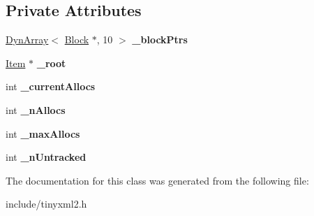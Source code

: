 \subsection*{Private Attributes}
\begin{DoxyCompactItemize}
\item 
\mbox{\label{classtinyxml2_1_1MemPoolT_a028d833de2bf5e6257b4b27a68702a84}} 
\mbox{\hyperlink{classtinyxml2_1_1DynArray}{Dyn\+Array}}$<$ \mbox{\hyperlink{structtinyxml2_1_1MemPoolT_1_1Block}{Block}} $\ast$, 10 $>$ {\bfseries \+\_\+block\+Ptrs}
\item 
\mbox{\label{classtinyxml2_1_1MemPoolT_aff60ad785be00814e442e53fb4462688}} 
\mbox{\hyperlink{uniontinyxml2_1_1MemPoolT_1_1Item}{Item}} $\ast$ {\bfseries \+\_\+root}
\item 
\mbox{\label{classtinyxml2_1_1MemPoolT_afa908fd62011c6e633d7af196d667e9d}} 
int {\bfseries \+\_\+current\+Allocs}
\item 
\mbox{\label{classtinyxml2_1_1MemPoolT_acd5867e06ad91a655f3c9f95ca163e9b}} 
int {\bfseries \+\_\+n\+Allocs}
\item 
\mbox{\label{classtinyxml2_1_1MemPoolT_aaf3960c9e30197aeb1c0af271c297db9}} 
int {\bfseries \+\_\+max\+Allocs}
\item 
\mbox{\label{classtinyxml2_1_1MemPoolT_a5048ad99f7350f7224b13cf85fbff151}} 
int {\bfseries \+\_\+n\+Untracked}
\end{DoxyCompactItemize}


The documentation for this class was generated from the following file\+:\begin{DoxyCompactItemize}
\item 
include/tinyxml2.\+h\end{DoxyCompactItemize}
